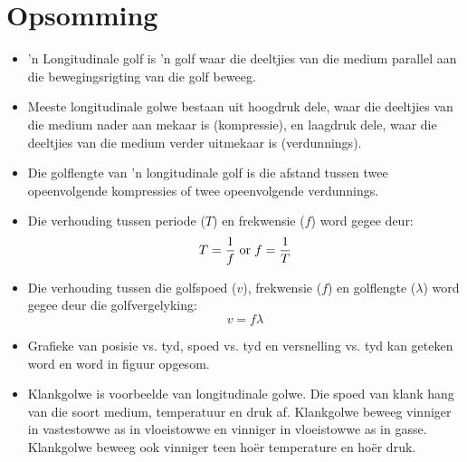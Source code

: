     \noindent
  \label{m38782**end}
                   \label{m38783*cid8}
            \section{Opsomming}
            \nopagebreak
      \label{m38783*id293550}\begin{itemize}[noitemsep] 
            \label{m38783*uid20}\item 'n Longitudinale golf is 'n golf waar die deeltjies van die medium parallel aan die bewegingsrigting van die golf beweeg.
\label{m38783*uid21}\item Meeste longitudinale golwe bestaan uit hoogdruk dele, waar die deeltjies van die medium nader aan mekaar is (kompressie), en laagdruk dele, waar die deeltjies van die medium verder uitmekaar is (verdunnings).
\label{m38783*uid22}\item Die golflengte van 'n longitudinale golf is die afstand tussen twee opeenvolgende kompressies of twee opeenvolgende verdunnings.
\label{m38783*uid23}\item Die verhouding tussen periode ($T$) en frekwensie ($f$) word gegee deur:
\label{m38783*id293619}\nopagebreak\noindent{}
    \begin{equation}\nonumber
    T=\frac{1}{f}\phantom{\rule{3pt}{0ex}}\text{or}\phantom{\rule{3pt}{0ex}}f=\frac{1}{T}
      \end{equation}
    \label{m38783*uid24}\item Die verhouding tussen die golfspoed ($v$), frekwensie ($f$) en golflengte ($\lambda$) word gegee deur die golfvergelyking:
\label{m38783*id293694}\nopagebreak\noindent{}
    \begin{equation}\nonumber
    v=f\lambda
      \end{equation}
    \label{m38783*uid25}\item Grafieke van posisie vs. tyd, spoed vs. tyd en versnelling vs. tyd kan geteken word en word in figuur \label{m38783*uid26} opgesom.
\item Klankgolwe is voorbeelde van longitudinale golwe. Die spoed van klank hang van die soort medium, temperatuur en druk af. Klankgolwe beweeg vinniger in vastestowwe as in vloeistowwe en vinniger in vloeistowwe as in gasse. Klankgolwe beweeg ook vinniger teen ho\"er temperature en ho\"er druk.
\end{itemize}
